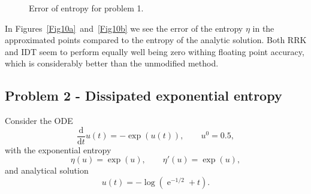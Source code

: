 \documentclass{article}
\renewcommand{\exp}[1]{\operatorname{e}^{#1}}
\newcommand{\expalt}{\operatorname{exp}}
\begin{document}
    \begin{figure}[H]
        \centering
        \hfill
        \hfill
        \caption{Error of entropy for problem 1.}\label{Fig10}
    \end{figure}

    In Figures~\ref{Fig10a}~and~\ref{Fig10b} we see the error of the entropy \(\eta\) in the approximated points compared to the entropy of the analytic solution. Both RRK and IDT seem to perform equally well being zero withing floating point accuracy, which is considerably better than the unmodified method.

\subsection{Problem 2 - Dissipated exponential entropy}
    Consider the ODE
    \[\frac{\text{d}}{\text{d}t} u(t) = -\expalt(u(t)), \qquad u^0 = 0.5,\]
    with the exponential entropy
    \[\eta(u) = \expalt(u), \qquad \eta'(u) = \expalt(u),\]
    and analytical solution
    \[u(t) = -\log(\exp{-1/2}+t).\]
\end{document}
